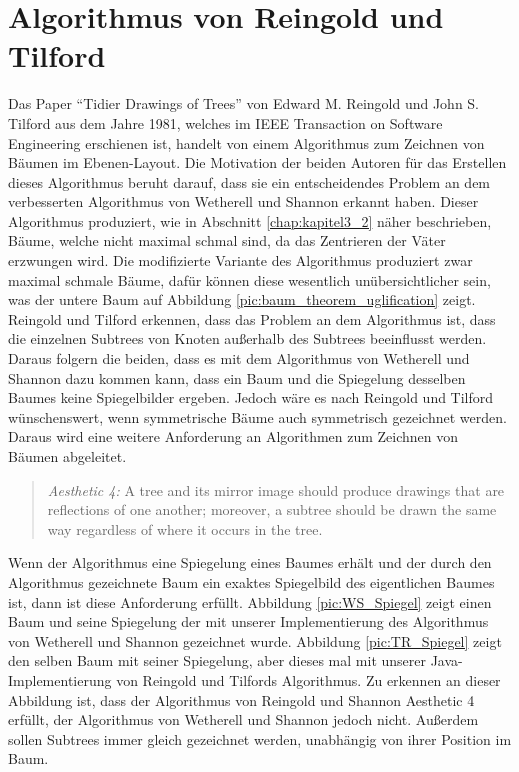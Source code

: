 \label{chap:kapitel3_3}
\section{Algorithmus von Reingold und Tilford}
Das Paper “Tidier Drawings of Trees” von Edward M. Reingold und John S. Tilford aus dem Jahre 1981,
welches im IEEE Transaction on Software Engineering erschienen ist, handelt von einem Algorithmus zum Zeichnen von Bäumen im Ebenen-Layout.
Die Motivation der beiden Autoren für das Erstellen dieses Algorithmus beruht darauf, dass sie ein entscheidendes Problem an dem 
verbesserten Algorithmus von Wetherell und Shannon erkannt haben. Dieser Algorithmus produziert, wie in Abschnitt \ref{chap:kapitel3_2} 
näher beschrieben, Bäume, welche nicht maximal schmal sind, da das Zentrieren der Väter erzwungen wird. Die modifizierte Variante des 
Algorithmus produziert zwar maximal schmale Bäume, dafür können diese wesentlich unübersichtlicher sein, was der untere Baum auf Abbildung \ref{pic:baum_theorem_uglification} 
zeigt. Reingold und Tilford erkennen, dass das Problem an dem Algorithmus ist, dass die einzelnen Subtrees von Knoten außerhalb des Subtrees 
beeinflusst werden. Daraus folgern die beiden, dass es mit dem Algorithmus von Wetherell und Shannon dazu kommen kann, dass ein Baum und 
die Spiegelung desselben Baumes keine Spiegelbilder ergeben. Jedoch wäre es nach Reingold und Tilford wünschenswert, wenn symmetrische Bäume 
auch symmetrisch gezeichnet werden. Daraus wird eine weitere Anforderung an Algorithmen zum Zeichnen von Bäumen abgeleitet.\cite[]{q2}

\begin{quotation}
	\textit{Aesthetic 4:} A tree and its mirror image should produce
    drawings that are reflections of one another; moreover, a subtree
    should be drawn the same way regardless of where it
    occurs in the tree.\cite[]{q4}
\end{quotation}

Wenn der Algorithmus eine Spiegelung eines Baumes erhält und der durch den Algorithmus gezeichnete Baum ein exaktes Spiegelbild des 
eigentlichen Baumes ist, dann ist diese Anforderung erfüllt. Abbildung \ref{pic:WS_Spiegel} zeigt einen Baum und seine Spiegelung der mit 
unserer Implementierung des Algorithmus von Wetherell und Shannon gezeichnet wurde. Abbildung \ref{pic:TR_Spiegel} zeigt den selben Baum mit 
seiner Spiegelung, aber dieses mal mit unserer Java-Implementierung von Reingold und Tilfords Algorithmus. Zu erkennen an dieser Abbildung ist, 
dass der Algorithmus von Reingold und Shannon Aesthetic 4 erfüllt, der Algorithmus von Wetherell und Shannon jedoch nicht. Außerdem sollen 
Subtrees immer gleich gezeichnet werden, unabhängig von ihrer Position im Baum.

